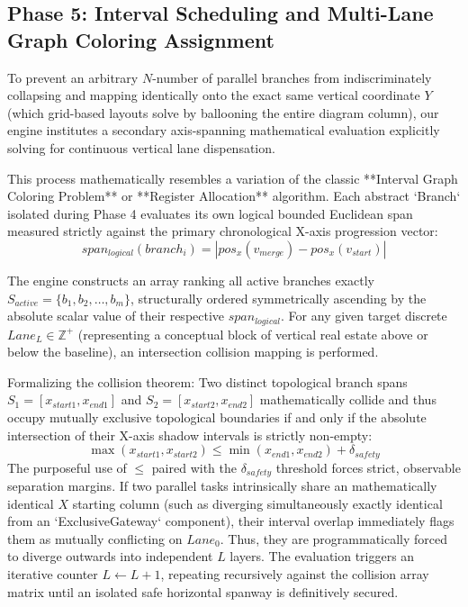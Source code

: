 \documentclass[fleqn,10pt]{wlscirep}
\begin{document}
\subsection*{Phase 5: Interval Scheduling and Multi-Lane Graph Coloring Assignment}
To prevent an arbitrary $N$-number of parallel branches from indiscriminately collapsing and mapping identically onto the exact same vertical coordinate $Y$ (which grid-based layouts solve by ballooning the entire diagram column), our engine institutes a secondary axis-spanning mathematical evaluation explicitly solving for continuous vertical lane dispensation. 

This process mathematically resembles a variation of the classic **Interval Graph Coloring Problem** or **Register Allocation** algorithm. Each abstract `Branch` isolated during Phase 4 evaluates its own logical bounded Euclidean span measured strictly against the primary chronological X-axis progression vector: 
$$ span_{logical}(branch_i) = |pos_{x}(v_{merge}) - pos_{x}(v_{start})| $$

The engine constructs an array ranking all active branches exactly $S_{active} = \{b_1, b_2, \dots, b_m\}$, structurally ordered symmetrically ascending by the absolute scalar value of their respective $span_{logical}$. For any given target discrete $Lane_L \in \mathbb{Z}^+$ (representing a conceptual block of vertical real estate above or below the baseline), an intersection collision mapping is performed.

Formalizing the collision theorem:
Two distinct topological branch spans $S_{1} = [x_{start1}, x_{end1}]$ and $S_{2} = [x_{start2}, x_{end2}]$ mathematically collide and thus occupy mutually exclusive topological boundaries if and only if the absolute intersection of their X-axis shadow intervals is strictly non-empty:
$$ \max(x_{start1}, x_{start2}) \le \min(x_{end1}, x_{end2}) + \delta_{safety} $$
The purposeful use of $\le$ paired with the $\delta_{safety}$ threshold forces strict, observable separation margins. If two parallel tasks intrinsically share an mathematically identical $X$ starting column (such as diverging simultaneously exactly identical from an `ExclusiveGateway` component), their interval overlap immediately flags them as mutually conflicting on $Lane_0$. Thus, they are programmatically forced to diverge outwards into independent $L$ layers. The evaluation triggers an iterative counter $L \gets L + 1$, repeating recursively against the collision array matrix until an isolated safe horizontal spanway is definitively secured.
\end{document}
